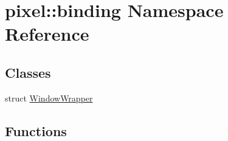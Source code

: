 \hypertarget{namespacepixel_1_1binding}{}\section{pixel\+:\+:binding Namespace Reference}
\label{namespacepixel_1_1binding}
\subsection*{Classes}
\begin{DoxyCompactItemize}
\item 
struct \hyperlink{structpixel_1_1binding_1_1_window_wrapper}{Window\+Wrapper}
\end{DoxyCompactItemize}
\subsection*{Functions}
